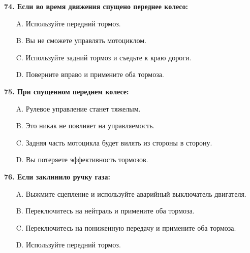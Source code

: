 \begin{minipage}{\linewidth}
\vspace{1em}\noindent\textbf{74. Если во время движения спущено переднее колесо:}

\begin{itemize}[nosep,leftmargin=2em]
\item [A.] Используйте передний тормоз.
\item [B.] Вы не сможете управлять мотоциклом.
\item [C.] Используйте задний тормоз и съедьте к краю дороги.
\item [D.] Поверните вправо и примените оба тормоза.

\end{itemize}
\end{minipage}


\begin{minipage}{\linewidth}
\vspace{1em}\noindent\textbf{75. При спущенном переднем колесе:}

\begin{itemize}[nosep,leftmargin=2em]
\item [A.] Рулевое управление станет тяжелым.
\item [B.] Это никак не повлияет на управляемость.
\item [C.] Задняя часть мотоцикла будет вилять из стороны в сторону.
\item [D.] Вы потеряете эффективность тормозов.

\end{itemize}
\end{minipage}


\begin{minipage}{\linewidth}
\vspace{1em}\noindent\textbf{76. Если заклинило ручку газа:}

\begin{itemize}[nosep,leftmargin=2em]
\item [A.] Выжмите сцепление и используйте аварийный выключатель двигателя.
\item [B.] Переключитесь на нейтраль и примените оба тормоза.
\item [C.] Переключитесь на пониженную передачу и примените оба тормоза.
\item [D.] Используйте передний тормоз.

\end{itemize}
\end{minipage}


